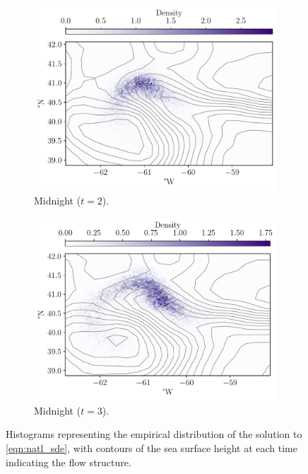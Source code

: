 \begin{figure}
\begin{subfigure}{0.49\textwidth}
		\includegraphics[width=\textwidth]{chp06_applications/figures/gulf_stream/rels_ssh_2.0}
		\caption{Midnight  (\(t = 2\)).}
		\label{fig:na_hist_t3_2}
	\end{subfigure}
	\begin{subfigure}{0.49\textwidth}
		\includegraphics[width=\textwidth]{chp06_applications/figures/gulf_stream/rels_ssh_3.0}
		\caption{Midnight  (\(t = 3\)).}
		\label{fig:na_hist_t3_3}
	\end{subfigure}
	\caption{Histograms representing the empirical distribution of the solution to \cref{eqn:natl_sde}, with contours of the sea surface height at each time indicating the flow structure.}
	\label{fig:na_hist_t3}
\end{figure}

